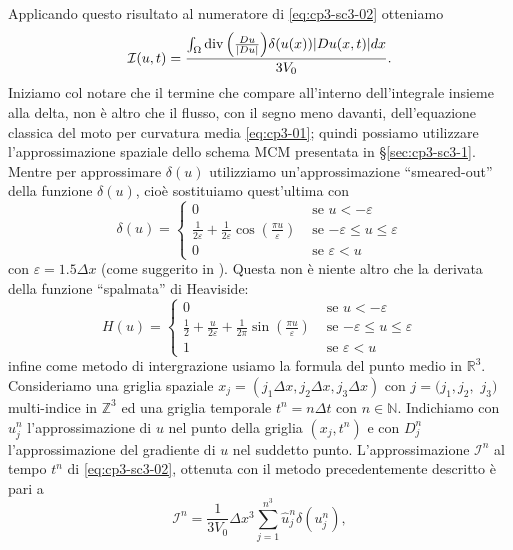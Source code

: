 Applicando questo risultato al numeratore di \eqref{eq:cp3-sc3-02}
otteniamo
\begin{equation}
  \label{eq:cp3-sc3-07}
\mathcal{I}(u,t) = \frac{\int_{\Omega}\operatorname{div}{\left(\frac{Du}{|Du|}\right)}\delta(u(x))|Du(x,t)|dx}{3V_0}.
\end{equation}
Iniziamo col notare che il termine che compare all'interno
dell'integrale insieme alla delta, non è altro che il flusso, con il
segno meno davanti, dell'equazione classica del moto per curvatura
media \eqref{eq:cp3-01}; quindi possiamo utilizzare l'approssimazione
spaziale dello schema MCM presentata in §\ref{sec:cp3-sc3-1}. Mentre
per approssimare $\delta(u)$ utilizziamo un'approssimazione
``smeared-out'' della funzione $\delta(u)$, cioè sostituiamo
quest'ultima con
\begin{equation}
  \label{eq:cp3-sc3-08}
  \delta(u)=
  \begin{cases}
    0 &\text{ se $u<-\varepsilon$} \\
    \frac{1}{2\varepsilon}+\frac{1}{2\varepsilon}\cos\left(\frac{\pi
      u}{\varepsilon}\right) &\text{ se $-\varepsilon\leq u \leq\varepsilon$} \\
    0 &\text{ se $\varepsilon<u$}
  \end{cases}
\end{equation}
con $\varepsilon=1.5\Delta x$ (come suggerito in
\cite[][§1.5]{osher:fed}). Questa non è niente altro che la derivata
della funzione ``spalmata'' di Heaviside:
\[
H(u)=
\begin{cases}
 0 &\text{ se $u<-\varepsilon$} \\
    \frac{1}{2}+\frac{u}{2\varepsilon} +\frac{1}{2\pi}\sin\left(\frac{\pi
      u}{\varepsilon}\right) &\text{ se $-\varepsilon\leq u \leq\varepsilon$} \\
 1 &\text{ se $\varepsilon<u$} 
\end{cases}
\]
infine come metodo di intergrazione usiamo la formula del punto medio
in $\mathbb{R}^3$. 
Consideriamo una griglia spaziale $x_j=(j_1\Delta x,j_2\Delta
x,j_3\Delta x)$ con $j=(j_1,j_2,$ $j_3)$ multi-indice in $\mathbb{Z}^3$ ed una griglia temporale $t^n=n\Delta t$ con $n\in\mathbb{N}$.
Indichiamo con $u_j^n$ l'approssimazione di $u$ nel punto della
griglia $(x_j,t^n)$ e con $D_j^n$ l'approssimazione del gradiente di
$u$ nel suddetto punto. L'approssimazione $\mathcal{I}^n$ al
tempo $t^n$ di  \eqref{eq:cp3-sc3-02}, ottenuta con il metodo precedentemente
descritto è pari a 
\begin{equation}
\label{eq:cp3-sc3-08-add}
\mathcal{I}^n=\frac{1}{3V_0}\Delta x^3\sum_{j=1}^{n^3}\hat{u}_j^n\delta(u_j^n),
\end{equation}

